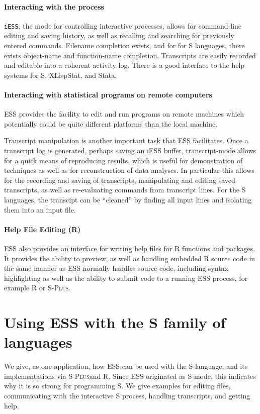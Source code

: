 \documentclass{article}
\newcommand*{\Splus}{\textsc{S-Plus}}
\begin{document}
\paragraph{Interacting with the process}
{\tt iESS}, the mode for controlling interactive processes, allows for
command-line editing and saving history, as well as recalling and
searching for previously entered commands.  Filename completion exists,
and for for S languages, there exists object-name and function-name completion.
Transcripts are easily recorded and editable into a coherent activity
log.   There is a good interface to the help systems for S,
XLispStat, and Stata.

\paragraph{Interacting with statistical programs on remote computers}
ESS provides the facility to edit and
run programs on remote machines which potentially could be quite
different platforms than the local machine.

Transcript manipulation is another important task that ESS
facilitates.  Once a transcript log is generated, perhaps saving an
iESS buffer, transcript-mode allows for a quick means of reproducing
results, which is useful for demonstration of techniques as well as
for reconstruction of data analyses.  In particular this allows for
the recording and saving of transcripts, manipulating and editing
saved transcripts, as well as re-evaluating commands from transcript
lines.  For the S languages, the transcipt can be ``cleaned'' by
finding all input lines and isolating them into an input file.

\paragraph{Help File Editing (R)}
ESS also provides an interface for writing help files for R functions
and packages.    It provides the ability to preview, as well as
handling embedded R source code in the same manner as ESS normally
handles source code, including syntax highlighting as well as the
ability to submit code to a running ESS process, for example R or
\Splus. 

\section{Using ESS with the S family of languages}
\label{sec:S}

We give, as one application, how ESS can be used with the S language,
and its implementations via \Splus and R.  Since ESS originated as
S-mode, this indicates why it is so strong for programming S.  We give
examples for editing files, communicating with the interactive S
process, handling transcripts, and getting help.
\end{document}
